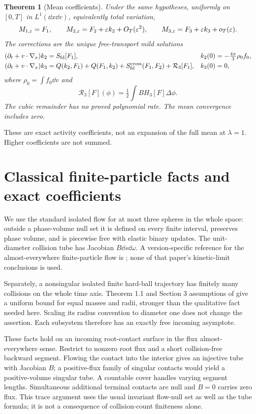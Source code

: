 \documentclass[11pt,letterpaper]{article}
\newtheorem{theorem}{Theorem}[section]
\theoremstyle{remark}\newtheorem{remark}[theorem]{Remark}
\numberwithin{equation}{section}
\newcommand{\Sfd}{S_{\mathrm{fd}}}\newcommand{\U}{\mathcal U}\newcommand{\D}{\mathcal D}
\begin{document}
\begin{theorem}[Mean coefficients]\label{thm:mean}
Under the same hypotheses, uniformly on $[0,T]$ in $L^1(\dd x\dd v)$, equivalently total variation,
\[
 M_{1,\varepsilon}=F_1,\qquad M_{2,\varepsilon}=F_2+\varepsilon k_2+O_T(\varepsilon^2),\qquad
 M_{3,\varepsilon}=F_3+\varepsilon k_3+o_T(\varepsilon).
\]
The corrections are the unique free-transport mild solutions
\begin{align}
 (\partial_t+v\cdot\nabla_x)k_2&=\Sfd[F_1],
 &k_2(0)&=-\tfrac{4\pi}{3}\rho_0f_0,\label{eq:k2}\\
 (\partial_t+v\cdot\nabla_x)k_3
 &=Q(k_2,F_1)+Q(F_1,k_2)+\Sfd^{\rm cross}(F_1,F_2)+\mathcal R_3[F_1],
 &k_3(0)&=0,\label{eq:k3}
\end{align}
where $\rho_0=\int f_0\dd v$ and
\begin{equation}\label{eq:R3}
 \mathcal R_3[F](\phi)=\tfrac12\int BH_3[F]\Delta\phi.
\end{equation}
The cubic remainder has no proved polynomial rate. The mean convergence includes zero.
\end{theorem}
These are exact activity coefficients, not an expansion of the full mean at $\lambda=1$. Higher coefficients are not summed.

\section{Classical finite-particle facts and exact coefficients}
We use the standard isolated flow for at most three spheres in the whole space: outside a phase-volume null set it is defined on every finite interval, preserves phase volume, and is piecewise free with elastic binary updates. The unit-diameter collision tube has Jacobian $B\dd s\dd\omega$. A version-specific reference for the almost-everywhere finite-particle flow is \cite[Proposition 1.2]{DHM}; none of that paper's kinetic-limit conclusions is used.

Separately, a nonsingular isolated finite hard-ball trajectory has finitely many collisions on the whole time axis. Theorem 1.1 and Section 3 assumptions of \cite{Burdzy} give a uniform bound for equal masses and radii, stronger than the qualitative fact needed here. Scaling its radius convention to diameter one does not change the assertion. Each subsystem therefore has an exactly free incoming asymptote.

These facts hold on an incoming root-contact surface in the flux almost-everywhere sense. Restrict to nonzero root flux and a short collision-free backward segment. Flowing the contact into the interior gives an injective tube with Jacobian $B$; a positive-flux family of singular contacts would yield a positive-volume singular tube. A countable cover handles varying segment lengths. Simultaneous additional terminal contacts are null and $B=0$ carries zero flux. This trace argument uses the usual invariant flow-null set as well as the tube formula; it is not a consequence of collision-count finiteness alone.
\end{document}
